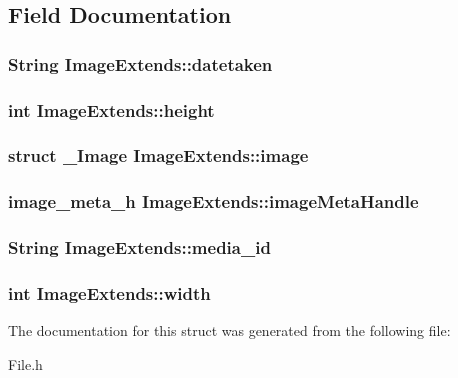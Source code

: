 \subsection{Field Documentation}
\subsubsection[{datetaken}]{\setlength{\rightskip}{0pt plus 5cm}String Image\-Extends\-::datetaken}\label{structImageExtends_ad1e716cd99e06270f1fda16fefb9f983}
\subsubsection[{height}]{\setlength{\rightskip}{0pt plus 5cm}int Image\-Extends\-::height}\label{structImageExtends_a9e4188eb124c95149e1a8a07fdfeebab}
\subsubsection[{image}]{\setlength{\rightskip}{0pt plus 5cm}struct {\bf \-\_\-\-Image} Image\-Extends\-::image}\label{structImageExtends_ad20b4a587ebaacd662338ca79f8d3228}
\subsubsection[{image\-Meta\-Handle}]{\setlength{\rightskip}{0pt plus 5cm}image\-\_\-meta\-\_\-h Image\-Extends\-::image\-Meta\-Handle}\label{structImageExtends_aa51c25239b8bb5b643eac4e924bb86a9}
\subsubsection[{media\-\_\-id}]{\setlength{\rightskip}{0pt plus 5cm}String Image\-Extends\-::media\-\_\-id}\label{structImageExtends_acefdc4af6e8b97f98f90aaded38e7543}
\subsubsection[{width}]{\setlength{\rightskip}{0pt plus 5cm}int Image\-Extends\-::width}\label{structImageExtends_a1ec94b5dc6a2a278d14056a3be1e727e}


The documentation for this struct was generated from the following file\-:\begin{DoxyCompactItemize}
\item 
File.\-h\end{DoxyCompactItemize}
